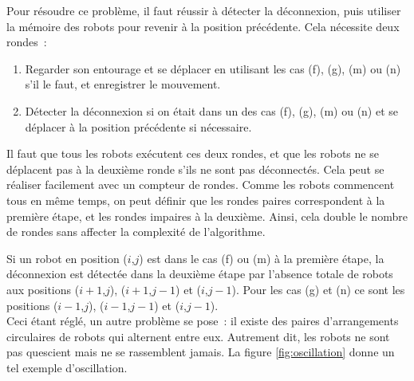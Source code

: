 


Pour résoudre ce problème, il faut réussir à détecter la déconnexion, puis
utiliser la mémoire des robots pour revenir à la position précédente. Cela
nécessite deux rondes~:
\begin{enumerate}[1]
  \item Regarder son entourage et se déplacer en utilisant les cas (f), (g),
  (m) ou (n) s'il le faut, et enregistrer le mouvement.
  \item Détecter la déconnexion si on était dans un des cas (f), (g), (m) ou
  (n) et se déplacer à la position précédente si nécessaire.
\end{enumerate}
Il faut que tous les robots exécutent ces deux rondes, et que les robots ne se
déplacent pas à la deuxième ronde s'ils ne sont pas déconnectés. Cela peut se
réaliser facilement avec un compteur de rondes. Comme les robots commencent
tous en même temps, on peut définir que les rondes paires correspondent à la
première étape, et les rondes impaires à la deuxième. Ainsi, cela double le
nombre de rondes sans affecter la complexité de l'algorithme.

Si un robot en position ($i$,$j$) est dans le cas (f) ou (m) à la première
étape, la déconnexion est détectée dans la deuxième étape par l'absence totale
de robots aux positions ($i+1$,$j$), ($i+1$,$j-1$) et ($i$,$j-1$). Pour les cas
(g) et (n) ce sont les positions ($i-1$,$j$), ($i-1$,$j-1$) et ($i$,$j-1$). \\

Ceci étant réglé, un autre problème se pose~: il existe des paires
d'arrangements circulaires de robots qui alternent entre eux. Autrement dit,
les robots ne sont pas quescient mais ne se rassemblent jamais. La figure
\ref{fig:oscillation} donne un tel exemple d'oscillation.



